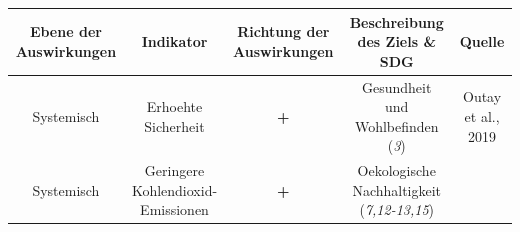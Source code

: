 \documentclass[
]{book}
\begin{document}
\begin{longtable}[]{@{}ccccc@{}}
\toprule
\begin{minipage}[b]{0.17\columnwidth}\centering
Ebene der Auswirkungen\strut
\end{minipage} & \begin{minipage}[b]{0.16\columnwidth}\centering
Indikator\strut
\end{minipage} & \begin{minipage}[b]{0.17\columnwidth}\centering
Richtung der Auswirkungen\strut
\end{minipage} & \begin{minipage}[b]{0.17\columnwidth}\centering
Beschreibung des Ziels \& SDG\strut
\end{minipage} & \begin{minipage}[b]{0.17\columnwidth}\centering
Quelle\strut
\end{minipage}\tabularnewline
\midrule
\endhead
\begin{minipage}[t]{0.17\columnwidth}\centering
Systemisch\strut
\end{minipage} & \begin{minipage}[t]{0.16\columnwidth}\centering
Erhoehte Sicherheit\strut
\end{minipage} & \begin{minipage}[t]{0.17\columnwidth}\centering
\textbf{+}\strut
\end{minipage} & \begin{minipage}[t]{0.17\columnwidth}\centering
Gesundheit und Wohlbefinden (\emph{3})\strut
\end{minipage} & \begin{minipage}[t]{0.17\columnwidth}\centering
Outay et al., 2019\strut
\end{minipage}\tabularnewline
\begin{minipage}[t]{0.17\columnwidth}\centering
Systemisch\strut
\end{minipage} & \begin{minipage}[t]{0.16\columnwidth}\centering
Geringere Kohlendioxid-Emissionen\strut
\end{minipage} & \begin{minipage}[t]{0.17\columnwidth}\centering
\textbf{+}\strut
\end{minipage} & \begin{minipage}[t]{0.17\columnwidth}\centering
Oekologische Nachhaltigkeit (\emph{7,12-13,15})\strut
\end{minipage} & \begin{minipage}[t]{0.17\columnwidth}\centering

\end{minipage}
\end{longtable}
\end{document}
